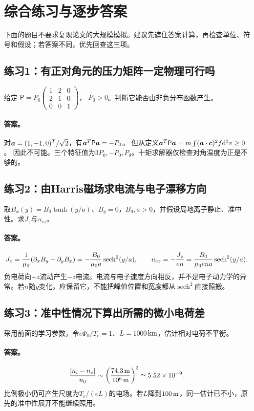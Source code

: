 \section{综合练习与逐步答案}
\label{sec:tutorial-exercises}
下面的题目不要求复现论文的大规模模拟。建议先遮住答案计算，再检查单位、符号和假设；若答案不同，优先回查这三项。

\subsection{练习1：有正对角元的压力矩阵一定物理可行吗}
给定
$\mathsf P=P_0\begin{pmatrix}1&2&0\\2&1&0\\0&0&1\end{pmatrix}$，
$P_0>0$。判断它能否由非负分布函数产生。
\paragraph{答案。}
对$\bm{a}=(1,-1,0)^T/\sqrt2$，有$\bm{a}^T\mathsf P\bm{a}=-P_0$。
但从定义$\bm{a}^T\mathsf P\bm{a}=m\int(\bm{a}\cdot\bm{c})^2f\mathrm d^3v\ge0$。
因此不可能。三个特征值为$3P_0,-P_0,P_0$。十矩求解器仅检查对角温度为正是不够的。

\subsection{练习2：由Harris磁场求电流与电子漂移方向}
取$B_x(y)=B_0\tanh(y/a)$、$B_y=0$，$B_0,a>0$，并假设局地离子静止、准中性。求$J_z$与$u_{ez}$。
\paragraph{答案。}
\begin{equation}
 J_z={1\over\mu_0}(\partial_xB_y-\partial_yB_x)
 =-{B_0\over\mu_0a}\operatorname{sech}^2(y/a),\qquad
 u_{ez}=-{J_z\over en}
 ={B_0\over\mu_0ena}\operatorname{sech}^2(y/a).
\end{equation}
负电荷向$+z$流动产生$-z$电流。电流与电子速度方向相反，并不是电子动力学的异常。若$n$随$y$变化，应保留它，不能把峰值位置和宽度都从$\operatorname{sech}^2$直接照搬。

\subsection{练习3：准中性情况下算出所需的微小电荷差}
采用前面的学习参数，令$e\Phi_0/T_e=1$、$L=1000\,{\rm km}$，估计相对电荷不平衡。
\paragraph{答案。}
\begin{equation}
 {|n_i-n_e|\over n_0}\sim
 \left({74.3\,{\rm m}\over10^6\,{\rm m}}\right)^2
 \simeq5.52\times10^{-9}.
\end{equation}
比例极小仍可产生尺度为$T_e/(eL)$的电场。若$L$降到$100\,{\rm m}$，同一估计已不小，原先的准中性展开不能继续照用。

